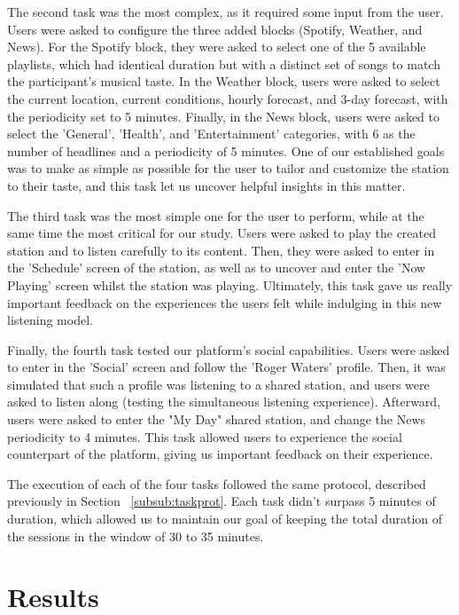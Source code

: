 The second task was the most complex, as it required some input from the user. Users were asked to configure the three added blocks (Spotify, Weather, and News). For the Spotify block, they were asked to select one of the 5 available playlists, which had identical duration but with a distinct set of songs to match the participant's musical taste. In the Weather block, users were asked to select the current location, current conditions, hourly forecast, and 3-day forecast, with the periodicity set to 5 minutes. Finally, in the News block, users were asked to select the 'General', 'Health', and 'Entertainment' categories, with 6 as the number of headlines and a periodicity of 5 minutes. One of our established goals was to make as simple as possible for the user to tailor and customize the station to their taste, and this task let us uncover helpful insights in this matter.

The third task was the most simple one for the user to perform, while at the same time the most critical for our study. Users were asked to play the created station and to listen carefully to its content. Then, they were asked to enter in the 'Schedule' screen of the station, as well as to uncover and enter the 'Now Playing' screen whilst the station was playing. Ultimately, this task gave us really important feedback on the experiences the users felt while indulging in this new listening model.

Finally, the fourth task tested our platform's social capabilities. Users were asked to enter in the 'Social' screen and follow the 'Roger Waters' profile. Then, it was simulated that such a profile was listening to a shared station, and users were asked to listen along (testing the simultaneous listening experience). Afterward, users were asked to enter the "My Day" shared station, and change the News periodicity to 4 minutes. This task allowed users to experience the social counterpart of the platform, giving us important feedback on their experience.

The execution of each of the four tasks followed the same protocol, described previously in Section ~\ref{subsub:taskprot}. Each task didn't surpass 5 minutes of duration, which allowed us to maintain our goal of keeping the total duration of the sessions in the window of 30 to 35 minutes.

\section{Results}

